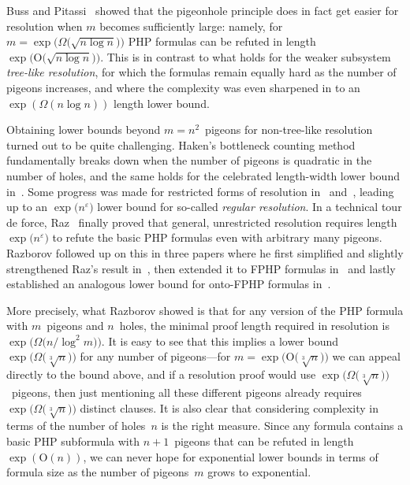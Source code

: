 \documentclass{theoretics}
\newcommand{\Bigoh}[1]{\mathrm{O} \bigl( #1 \bigr)}
\newcommand{\bigoh}[1]{\mathrm{O} ( #1 )}
\newcommand{\Bigomega}[1]{\Omega \bigl( #1 \bigr)}
\newcommand{\bigomega}[1]{\Omega ( #1 )}
\newcommand{\introduceterm}[1]{{\emph{#1}}}
\numberwithin{equation}{section}
\begin{document}
Buss and Pitassi~\cite{BP97Weak} showed that the pigeonhole principle
does in fact get easier for resolution when $m$ becomes sufficiently
large: namely, for 
$m = \exp \bigl( \Bigomega{\sqrt{n \log n}} \bigr)$
PHP formulas can be refuted in length
$\exp \bigl( \Bigoh{ \sqrt{n \log n} } \bigr)$.
This is in contrast to 
what holds for the  
weaker subsystem
\introduceterm{tree-like resolution},
for which 
the
formulas remain equally hard as the number of pigeons
increases, and where the 
complexity was even sharpened in  
\cite{BGL10,BP97Weak,Dant02,DantRiis01}
to an
$\exp ( \bigomega{ n \log n} )$ 
length
lower bound.

Obtaining lower bounds beyond $m = n^2$~pigeons for non-tree-like
resolution turned out to be quite challenging.
Haken's bottleneck counting method fundamentally breaks down when the
number of pigeons is quadratic in the number of holes, and the same
holds for the celebrated length-width lower bound
in~\cite{BW01ShortProofs}. 
Some progress was made for 
restricted forms of
resolution
in~\cite{RazbWigYao02} and~\cite{PitRaz04},
leading up to an
$\exp \bigl( n^\varepsilon \bigr)$
lower bound for so-called \introduceterm{regular resolution}.
In a technical tour de force, 
Raz~\cite{Raz04Resolution} finally proved 
that general, unrestricted resolution requires length
$\exp \bigl( n^\varepsilon \bigr)$
to refute the basic PHP formulas even with arbitrary many pigeons.
Razborov followed up on this in three papers where he first 
simplified and slightly strengthened 
Raz's result in~\cite{Razborov01ImprovedResolutionLowerBoundsWPHP},
then extended it to FPHP formulas
in~\cite{Razborov03ResolutionLowerBoundsWFPHP} 
and lastly established an analogous lower bound for onto-FPHP formulas
in~\cite{Razborov04ResolutionLowerBoundsPM}.


More precisely, what Razborov showed is that for any version of the PHP
formula with $m$~pigeons and $n$~holes, the minimal proof length
required in resolution is
$
\exp \bigl( \Bigomega{n / \log^2 m } \bigr)
$.
It is easy to see that this implies a lower bound
$
\exp \bigl( \Bigomega{\sqrt[3]{n} } \bigr)
$
for any number of pigeons---for 
$m = \exp \bigl( \Bigoh{\sqrt[3]{n}} \bigr)$
we can appeal directly to the bound above, and if a resolution proof
would use 
$\exp\bigl(\Bigomega{\sqrt[3]{n}} \bigr)$~pigeons, 
then just mentioning all these
different pigeons already requires
$\exp\bigl( \Bigomega{ \sqrt[3]{n} } \bigr)$ distinct clauses.
It is also clear that considering complexity in terms of the number of
holes~$n$ is the right measure. Since any formula contains a basic PHP
subformula with $n+1$~pigeons that can be refuted in
length~$\exp(\bigoh{n})$,
we can never hope for exponential lower bounds in terms of formula
size as the number of pigeons~$m$ grows to exponential.
\end{document}
